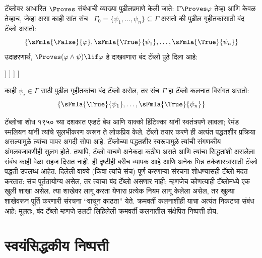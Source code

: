 टॅब्लोवर आधारित $\Proves$ संबंधाची व्याख्या पुढीलप्रमाणे केली जाते:
$\Gamma \Proves \varphi$ तेव्हा आणि केवळ तेव्हाच, जेव्हा असा काही सांत संच
~$\Gamma_0 = \{\psi_1, \dots, \psi_n\} \subseteq \Gamma$ असतो की पुढील
गृहीतकांसाठी बंद टॅब्लो असतो:
\[\{\sFmla{\False}{\varphi}, \sFmla{\True}{\psi_1}, \dots, \sFmla{\True}{\psi_n}\}
\]
उदाहरणार्थ, $\Proves (\varphi \land \psi) \lif \varphi$ हे दाखवणारा बंद टॅब्लो
पुढे दिला आहे:
\begin{oltableau}
  [\sFmla{\False}{(\varphi \land \psi) \lif \varphi}, just = \TAss
    [\sFmla{\True}{\varphi \land \psi}, just = {\TRule{\False}{\lif}[1]}
      [\sFmla{\False}{\varphi}, just = {\TRule{\False}{\lif}[1]}
        [\sFmla{\True}{\varphi}, just = {\TRule{\True}{\land}[2]}
          [\sFmla{\True}{\psi}, just = {\TRule{\True}{\land}[2]}, close]
        ]
      ]
    ]
  ]
\end{oltableau}

काही $\psi_i \in \Gamma$ साठी पुढील गृहीतकांचा बंद टॅब्लो असेल, तर
संच $\Gamma$ हा टॅब्लो कलनात विसंगत असतो:
\[\{\sFmla{\True}{\psi_1}, \dots, \sFmla{\True}{\psi_n}\}
\]

टॅब्लोचा शोध १९५० च्या दशकात एव्हर्ट बेथ आणि याक्को हिंटिक्का यांनी
स्वतंत्रपणे लावला; रेमंड स्मलियन यांनी त्यांचे सुलभीकरण करून ते लोकप्रिय
केले. टॅब्लो तयार करणे ही अत्यंत पद्धतशीर प्रक्रिया असल्यामुळे त्यांचा
वापर अगदी सोपा आहे. टॅब्लोच्या पद्धतशीर स्वरूपामुळे त्यांची
संगणकीय अंमलबजावणीही सुलभ होते. तथापि, टॅब्लो वाचणे अनेकदा कठीण
असते आणि त्यांचा सिद्धतांशी असलेला संबंध काही वेळा सहज दिसत नाही. ही
दृष्टीही बरीच व्यापक आहे आणि अनेक भिन्न तर्कशास्त्रांसाठी टॅब्लो
पद्धती उपलब्ध आहेत. दिलेली वाक्ये (किंवा त्यांचे संच) पूर्ण करणाऱ्या
संरचना शोधण्यासही टॅब्लो मदत करतात: संच पूर्ततायोग्य असेल,
तर त्याचा बंद टॅब्लो असणार नाही; म्हणजेच कोणत्याही टॅब्लोमध्ये
एक खुली शाखा असेल. त्या शाखेवर लागू करता येणारा प्रत्येक नियम लागू केलेला
असेल, तर खुल्या शाखेवरून पूर्ति करणारी संरचना ``वाचून काढता'' येते.
क्रमवर्ती कलनाशीही याचा अत्यंत निकटचा संबंध आहे: मूलतः, बंद टॅब्लो
म्हणजे उलटी लिहिलेली क्रमवर्ती कलनातील संक्षेपित निष्पत्ती होय.









\section{स्वयंसिद्धकीय निष्पत्ती}\label{fol:prf:axd:sec}

